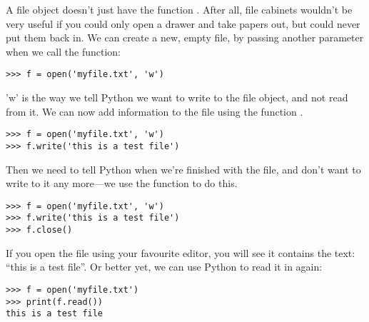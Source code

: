 A file object doesn't just have the function . After all, file cabinets wouldn't be very useful if you could only open a drawer and take papers out, but could never put them back in. We can create a new, empty file, by passing another parameter when we call the  function:

\begin{listing}
\begin{verbatim}
>>> f = open('myfile.txt', 'w')
\end{verbatim}
\end{listing}

'w' is the way we tell Python we want to write to the file object, and not read from it.  We can now add information to the file using the function .

\begin{listing}
\begin{verbatim}
>>> f = open('myfile.txt', 'w')
>>> f.write('this is a test file')
\end{verbatim}
\end{listing}

Then we need to tell Python when we're finished with the file, and don't want to write to it any more---we use the function  to do this.

\begin{listing}
\begin{verbatim}
>>> f = open('myfile.txt', 'w')
>>> f.write('this is a test file')
>>> f.close()
\end{verbatim}
\end{listing}

If you open the file using your favourite editor, you will see it contains the text: ``this is a test file''.  Or better yet, we can use Python to read it in again:

\begin{listing}
\begin{verbatim}
>>> f = open('myfile.txt')
>>> print(f.read())
this is a test file
\end{verbatim}
\end{listing}

\newpage